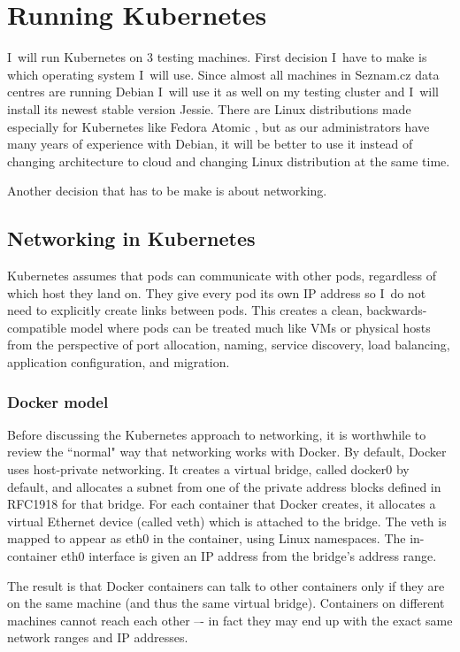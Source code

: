 \chapter{Running Kubernetes}

I~will run Kubernetes on 3 testing machines. First decision I~have to make is which operating system I~will use. Since almost all machines in Seznam.cz data centres are running Debian I~will use it as well on my testing cluster and I~will install its newest stable version Jessie. There are Linux distributions made especially for Kubernetes like Fedora Atomic \cite{fedora-atomic}, but as our administrators have many years of experience with Debian, it will be better to use it instead of changing architecture to cloud and changing Linux distribution at the same time.

Another decision that has to be make is about networking.

\section{Networking in Kubernetes}

Kubernetes assumes that pods can communicate with other pods, regardless of which host they land on. They give every pod its own IP address so I~do not need to explicitly create links between pods. This creates a clean, backwards-compatible model where pods can be treated much like VMs or physical hosts from the perspective of port allocation, naming, service discovery, load balancing, application configuration, and migration. \cite{kubernetesdoc}

\subsection{Docker model}
Before discussing the Kubernetes approach to networking, it is worthwhile to review the ``normal" way that networking works with Docker. By default, Docker uses host-private networking. It creates a virtual bridge, called docker0 by default, and allocates a subnet from one of the private address blocks defined in RFC1918 \cite{rfc1918} for that bridge. For each container that Docker creates, it allocates a virtual Ethernet device (called veth) which is attached to the bridge. The veth is mapped to appear as eth0 in the container, using Linux namespaces. The in-container eth0 interface is given an IP address from the bridge’s address range.

The result is that Docker containers can talk to other containers only if they are on the same machine (and thus the same virtual bridge). Containers on different machines cannot reach each other –- in fact they may end up with the exact same network ranges and IP addresses.

